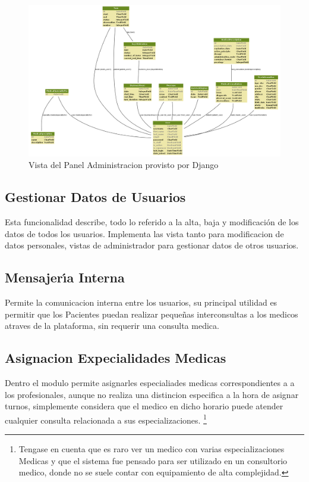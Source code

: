 \begin{figure}[h]
    \centering
    \includegraphics[scale=0.5]{resourse/gestionturnos-class-diagram.png}
    \caption{Vista del Panel Administracion provisto por Django}
    \label{fig:123}
\end{figure}  


\subsection{Gestionar Datos de Usuarios}

Esta funcionalidad describe, todo lo referido a la alta, baja y modificaci\'on de 
los datos de todos los usuarios. Implementa las vista tanto para modificacion de 
datos personales, vistas de administrador para gestionar datos de otros usuarios. 


\subsection{Mensajer\'{\i}a Interna}

Permite la comunicacion interna entre los usuarios, su principal utilidad es 
permitir que los Pacientes puedan realizar peque\~nas interconsultas a los 
medicos atraves de la plataforma, sin requerir una consulta medica.

\subsection{Asignacion Expecialidades Medicas}

Dentro el modulo permite asignarles especialiades medicas correspondientes a 
a los profesionales, aunque no realiza una distincion especifica a la hora de 
asignar turnos, simplemente considera que el medico en dicho horario puede 
atender cualquier consulta relacionada a sus especializaciones. \footnote{
Tengase en cuenta que es raro ver un medico con varias especializaciones Medicas
y que el sistema fue pensado para ser utilizado en un consultorio medico, donde
no se suele contar con equipamiento de alta complejidad.}

